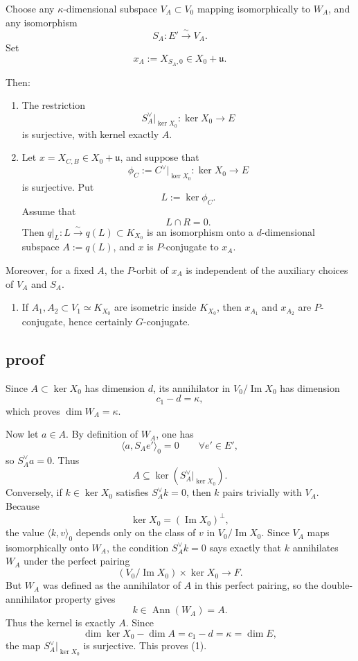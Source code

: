 \documentclass[
  11pt,
]{article}
\providecommand{\tightlist}{%
  \setlength{\itemsep}{0pt}\setlength{\parskip}{0pt}}
\begin{document}
Choose any \(\kappa\)-dimensional subspace \(V_A\subset V_0\) mapping
isomorphically to \(W_A\), and any isomorphism \[
S_A:E'\xrightarrow{\sim} V_A.
\] Set \[
x_A:=X_{S_A,0}\in X_0+\mathfrak u.
\]

Then:

\begin{enumerate}
\def\labelenumi{\arabic{enumi}.}
\item
  The restriction \[
  S_A^\vee|_{\ker X_0}:\ker X_0\to E
  \] is surjective, with kernel exactly \(A\).
\item
  Let \(x=X_{C,B}\in X_0+\mathfrak u\), and suppose that \[
  \phi_C:=C^\vee|_{\ker X_0}:\ker X_0\to E
  \] is surjective. Put \[
  L:=\ker \phi_C.
  \] Assume that \[
  L\cap R=0.
  \] Then \(q|_L:L\xrightarrow{\sim} q(L)\subset K_{X_0}\) is an
  isomorphism onto a \(d\)-dimensional subspace \(A:=q(L)\), and \(x\)
  is \(P\)-conjugate to \(x_A\).
\end{enumerate}

Moreover, for a fixed \(A\), the \(P\)-orbit of \(x_A\) is independent
of the auxiliary choices of \(V_A\) and \(S_A\).

\begin{enumerate}
\def\labelenumi{\arabic{enumi}.}
\setcounter{enumi}{2}
\tightlist
\item
  If \(A_1,A_2\subset V_1\simeq K_{X_0}\) are isometric inside
  \(K_{X_0}\), then \(x_{A_1}\) and \(x_{A_2}\) are \(P\)-conjugate,
  hence certainly \(G\)-conjugate.
\end{enumerate}

\subsection{proof}\label{proof-3}

Since \(A\subset \ker X_0\) has dimension \(d\), its annihilator in
\(V_0/\operatorname{Im} X_0\) has dimension \[
c_1-d=\kappa,
\] which proves \(\dim W_A=\kappa\).

Now let \(a\in A\). By definition of \(W_A\), one has \[
\langle a,S_Ae'\rangle_0=0\qquad \forall e'\in E',
\] so \(S_A^\vee a=0\). Thus \[
A\subseteq \ker(S_A^\vee|_{\ker X_0}).
\] Conversely, if \(k\in \ker X_0\) satisfies \(S_A^\vee k=0\), then
\(k\) pairs trivially with \(V_A\). Because \[
\ker X_0=(\operatorname{Im} X_0)^\perp,
\] the value \(\langle k,v\rangle_0\) depends only on the class of \(v\)
in \(V_0/\operatorname{Im} X_0\). Since \(V_A\) maps isomorphically onto
\(W_A\), the condition \(S_A^\vee k=0\) says exactly that \(k\)
annihilates \(W_A\) under the perfect pairing \[
(V_0/\operatorname{Im} X_0)\times \ker X_0\to F.
\] But \(W_A\) was defined as the annihilator of \(A\) in this perfect
pairing, so the double-annihilator property gives \[
k\in \operatorname{Ann}(W_A)=A.
\] Thus the kernel is exactly \(A\). Since \[
\dim \ker X_0-\dim A=c_1-d=\kappa=\dim E,
\] the map \(S_A^\vee|_{\ker X_0}\) is surjective. This proves (1).
\end{document}

